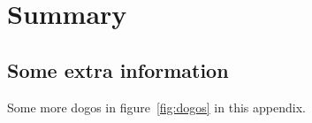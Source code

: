 \documentclass[12pt, a4paper, oneside]{article}
\begin{document}
\blindtext[2]

\clearpage


\section{Summary} \label{sec:summary}

\blindtext[3]

\clearpage


\nocite{*}

{
    \raggedright
    \printbibliography
}

\clearpage


\appendix
{} \label{sec:appendix}

\renewcommand{\thesubsection}{\Alph{subsection}}



\subsection{Some extra information} \label{appendix:extra}

Some more dogos in figure~\ref{fig:dogos} in this appendix. \medskip
\end{document}

